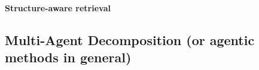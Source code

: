 \documentclass[11pt]{article}
\begin{document}
\paragraph{Structure-aware retrieval }

\subsection{Multi-Agent Decomposition (or agentic methods in general)}



\end{document}
